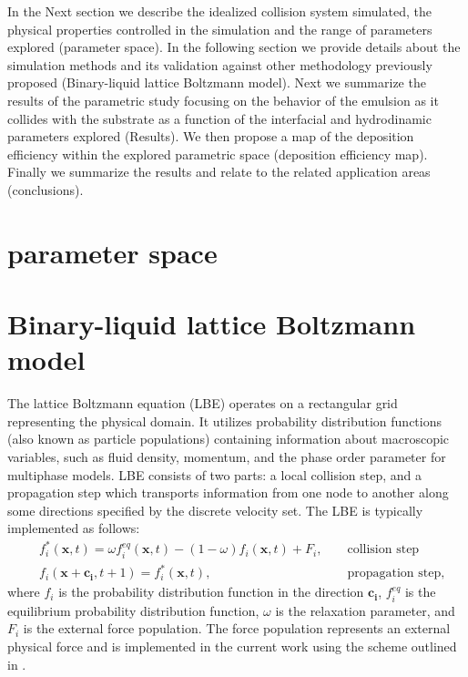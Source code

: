 \documentclass{article}
\begin{document}
In the Next section we describe the idealized collision system simulated, the physical properties controlled in the simulation and the range of parameters explored (parameter space). In the following section we provide details about the simulation methods and its validation against other methodology previously proposed (Binary-liquid lattice Boltzmann model). Next we summarize the results of the parametric study focusing on the behavior of the emulsion as it collides with the substrate as a function of the interfacial and hydrodinamic parameters explored (Results). We then propose a map of the deposition efficiency within the explored parametric space (deposition efficiency map). Finally we summarize the results and relate to the related application areas (conclusions). 
 
\section{parameter space}
 
\section{Binary-liquid lattice Boltzmann model}
The lattice Boltzmann equation (LBE) operates on a rectangular grid representing the
physical domain. It utilizes
probability distribution functions (also known as particle populations)
containing information about
macroscopic variables, such as fluid density, momentum, and the phase order parameter for multiphase models. LBE consists of
two parts: a local collision step, and a propagation step which transports
information from one node to another along some 
directions specified by the discrete velocity set.
The LBE is typically implemented as follows:
\begin{equation}
\label{standard:implementation}
\begin{aligned}
&f_i^{*}(\bm{x},t)=\omega f_i^{eq}(\bm{x},t)-(1-\omega) f_i(\bm{x},t) +
F_i,&&\text{ collision step}\\
&f_i(\bm{x}+\bm{c_i},t+1)=f_i^{*}(\bm{x},t),&&\text{ propagation step}, 
\end{aligned}
\end{equation}
where $f_i$ is the probability distribution function in the direction $\bm{c_i}$,
 $f_i^{eq}$ is the equilibrium probability distribution function, $\omega$ is the
relaxation parameter, and $F_i$ is the external force population. The force population
represents an external physical force and is implemented in the current work using the scheme
outlined in \citet{guo}.
\end{document}
